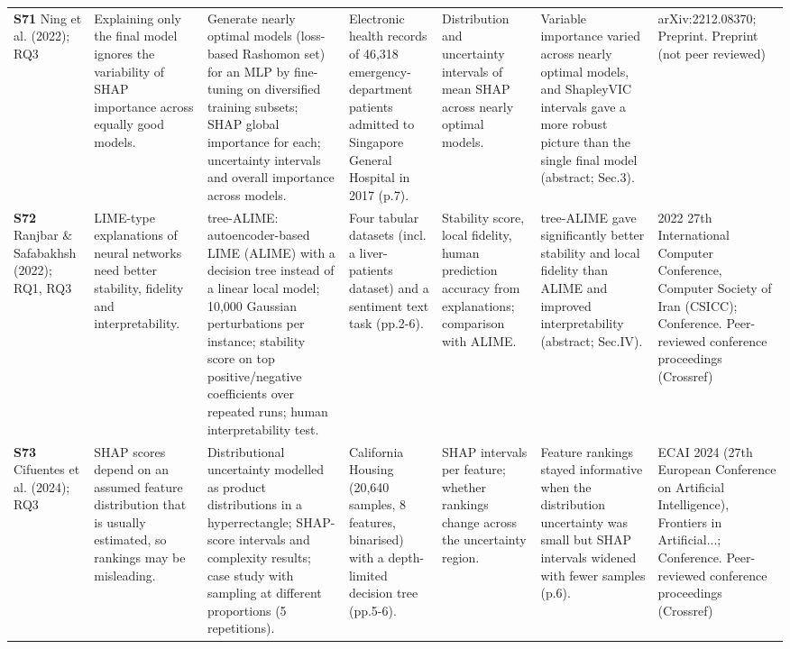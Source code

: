 \begin{longtable}{@{}P{1.55cm}P{2.9cm}P{4.5cm}P{3.2cm}P{3.4cm}P{4.6cm}P{3.6cm}@{}}
\textbf{S71} \cite{S71} Ning et al. (2022); RQ3 & Explaining only the final model ignores the variability of SHAP importance across equally good models. & Generate nearly optimal models (loss-based Rashomon set) for an MLP by fine-tuning on diversified training subsets; SHAP global importance for each; uncertainty intervals and overall importance across models. & Electronic health records of 46,318 emergency-department patients admitted to Singapore General Hospital in 2017 (p.7). & Distribution and uncertainty intervals of mean \textbar{}SHAP\textbar{} across nearly optimal models. & Variable importance varied across nearly optimal models, and ShapleyVIC intervals gave a more robust picture than the single final model (abstract; Sec.3). & arXiv:2212.08370; Preprint. Preprint (not peer reviewed) \\
\textbf{S72} \cite{S72} Ranjbar \& Safabakhsh (2022); RQ1, RQ3 & LIME-type explanations of neural networks need better stability, fidelity and interpretability. & tree-ALIME: autoencoder-based LIME (ALIME) with a decision tree instead of a linear local model; 10,000 Gaussian perturbations per instance; stability score on top positive/\allowbreak{}negative coefficients over repeated runs; human interpretability test. & Four tabular datasets (incl. a liver-patients dataset) and a sentiment text task (pp.2-6). & Stability score, local fidelity, human prediction accuracy from explanations; comparison with ALIME. & tree-ALIME gave significantly better stability and local fidelity than ALIME and improved interpretability (abstract; Sec.IV). & 2022 27th International Computer Conference, Computer Society of Iran (CSICC); Conference. Peer-reviewed conference proceedings (Crossref) \\
\textbf{S73} \cite{S73} Cifuentes et al. (2024); RQ3 & SHAP scores depend on an assumed feature distribution that is usually estimated, so rankings may be misleading. & Distributional uncertainty modelled as product distributions in a hyperrectangle; SHAP-score intervals and complexity results; case study with sampling at different proportions (5 repetitions). & California Housing (20,640 samples, 8 features, binarised) with a depth-limited decision tree (pp.5-6). & SHAP intervals per feature; whether rankings change across the uncertainty region. & Feature rankings stayed informative when the distribution uncertainty was small but SHAP intervals widened with fewer samples (p.6). & ECAI 2024 (27th European Conference on Artificial Intelligence), Frontiers in Artificial...; Conference. Peer-reviewed conference proceedings (Crossref) \\

\end{longtable}
